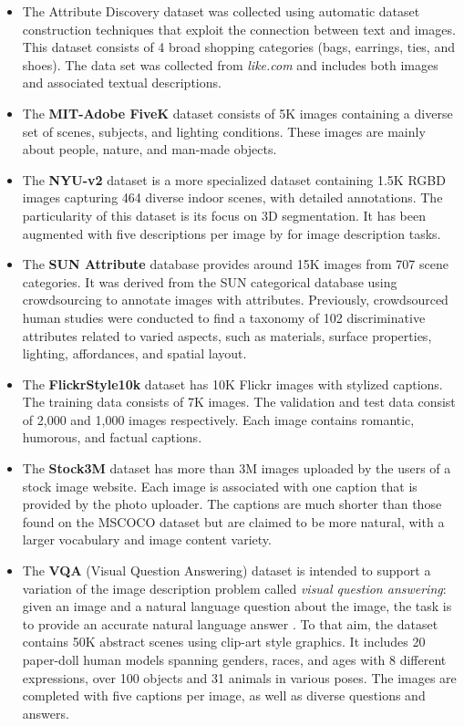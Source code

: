 \begin{itemize}
\item The Attribute Discovery dataset \citep{Berg2010} was collected using automatic dataset construction techniques that exploit the connection between text and images. This dataset consists of 4 broad shopping categories (bags, earrings, ties, and shoes). The data set was collected from \textit{like.com} and includes both images and associated textual descriptions.
\item The \textbf{MIT-Adobe FiveK} \citep{Bychkovsky2011} dataset consists of 5K images containing a diverse set of scenes, subjects, and lighting conditions. These images are mainly about people, nature, and man-made objects.
\item The \textbf{NYU-v2} dataset \citep{Silberman2012} is a more specialized dataset containing 1.5K RGBD images capturing 464 diverse indoor scenes, with detailed annotations. The particularity of this dataset is its focus on 3D segmentation. It has been augmented with five descriptions per image by \citet{Lin2015} for image description tasks.
\item The \textbf{SUN Attribute} database \citep{Patterson2014} provides around 15K  images from 707 scene categories. It was derived from the SUN categorical database using crowdsourcing to annotate images with attributes. Previously, crowdsourced human studies were conducted to find a taxonomy of 102 discriminative attributes related to varied aspects, such as materials, surface properties, lighting, affordances, and spatial layout.
\item The \textbf{FlickrStyle10k} dataset has 10K Flickr images with stylized captions. The training data consists of 7K images. The validation and test data consist of 2,000 and 1,000 images respectively. Each image contains romantic, humorous, and factual captions.
\item  The \textbf{Stock3M} dataset \citep{Wang2017} has more than 3M images uploaded by the users of a stock image website. Each image is associated with one caption that is provided by the photo uploader. The captions are much shorter than those found on the MSCOCO dataset but are claimed to be more natural, with a larger vocabulary and image content variety.
\item The \textbf{VQA} (Visual Question Answering) dataset is intended to support a variation of the image description problem called \textit{visual question answering}: given an image and a natural language question about the image, the task is to provide an accurate natural language answer \citep{Antol2015}. To that aim, the dataset contains 50K abstract scenes using clip-art style graphics. It includes 20 paper-doll human models spanning genders, races, and ages with 8 different expressions, over 100 objects and 31 animals in various poses. The images are completed with five captions per image, as well as diverse questions and answers.
\end{itemize}

